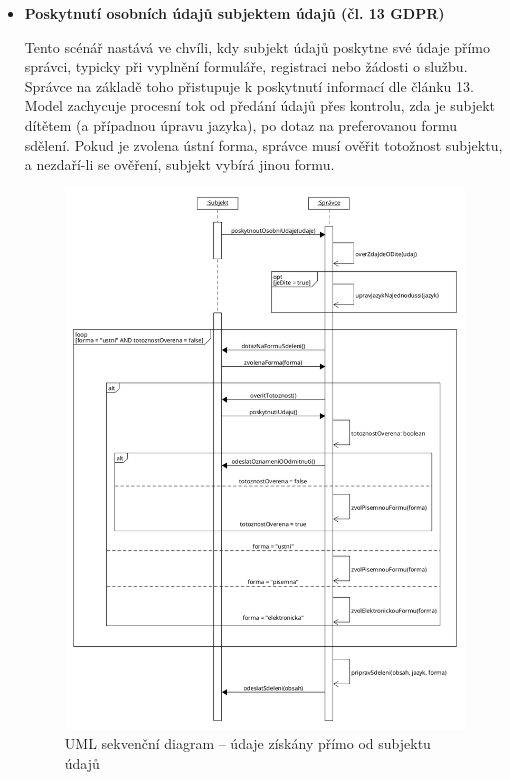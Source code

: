 \begin{itemize}
  \item \textbf{Poskytnutí osobních údajů subjektem údajů (čl. 13 GDPR)}

  Tento scénář nastává ve chvíli, kdy subjekt údajů poskytne své údaje přímo správci, typicky při vyplnění formuláře, registraci nebo žádosti o službu. Správce na základě toho přistupuje k poskytnutí informací dle článku 13. Model zachycuje procesní tok od předání údajů přes kontrolu, zda je subjekt dítětem (a případnou úpravu jazyka), po dotaz na preferovanou formu sdělení. Pokud je zvolena ústní forma, správce musí ověřit totožnost subjektu, a nezdaří-li se ověření, subjekt vybírá jinou formu.

  \begin{figure}[H]
    \centering
    \includegraphics[width=\textwidth]{images/UML_sekvence_informace_primo.png}
    \caption{UML sekvenční diagram – údaje získány přímo od subjektu údajů}
    \label{fig:uml_sekvence_informace_primo}
  \end{figure}


\end{itemize}
